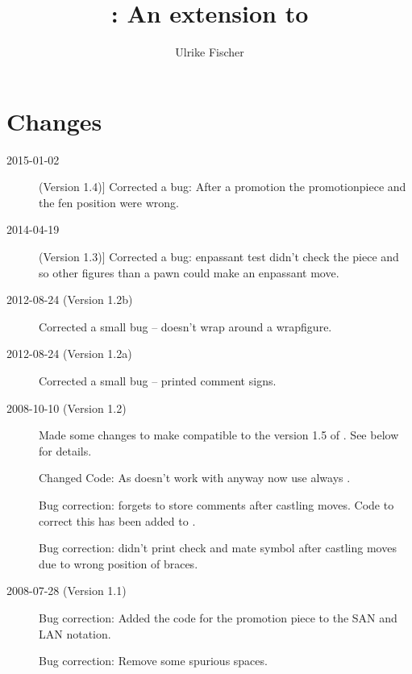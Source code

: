 \documentclass[pagesize,parskip=half-,fontsize=12pt]{scrartcl}
\begin{document}
\title{: An extension to \skaksty}
\author{Ulrike Fischer}
\maketitle

\tableofcontents

\section{Changes}
\begin{description}
\item[2015-01-02] (Version 1.4)] Corrected a bug: After a promotion the promotionpiece and the fen position were wrong.
\item[2014-04-19] (Version 1.3)] Corrected a bug: enpassant test didn't check the piece and so other figures than a pawn could make an enpassant move.
\item[2012-08-24 (Version 1.2b)]
Corrected a small bug --  doesn't wrap around a wrapfigure.


\item[2012-08-24 (Version 1.2a)]
Corrected a small bug --  printed comment signs.

\item[2008-10-10 (Version 1.2)]
Made some changes to make \xskak compatible to the version 1.5 of
\skaksty. See below for details.

Changed Code: As  doesn't work with 
anyway  now use always .

Bug correction: \skaksty forgets to store comments after castling
moves. Code to correct this has been added to \xskak.

Bug correction: \xskak didn't print check and mate symbol after
castling moves due to wrong position of braces.

\item[2008-07-28 (Version 1.1)]
Bug correction: Added the code for the promotion piece to the SAN and
LAN notation.

Bug correction: Remove some spurious spaces.

\end{description}

%
%
\end{document}
